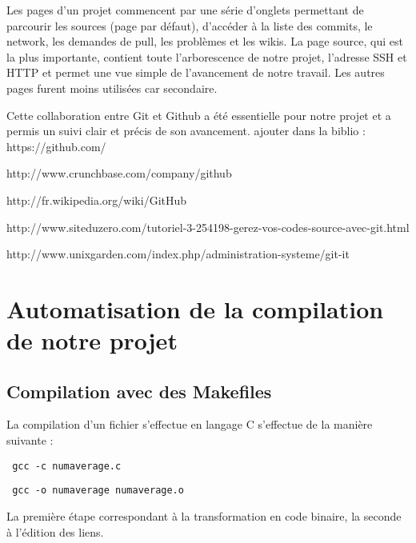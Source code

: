 Les pages d'un projet commencent par une s\'erie d'onglets permettant de parcourir les sources (page par d\'efaut), d'acc\'eder \`a la liste des
 commits, le network, les demandes de pull, les probl\`emes et les wikis.
La page source, qui est la plus importante, contient toute l'arborescence de notre projet, l'adresse SSH et HTTP et permet une vue simple
 de l'avancement de notre travail.
Les autres pages furent moins utilis\'ees car secondaire. 

Cette collaboration entre Git et Github a \'et\'e essentielle pour notre projet et a permis un suivi clair et pr\'ecis de son avancement.
\newline
\newline
\newline
\newline
ajouter dans la biblio :
\newline
https://github.com/

http://www.crunchbase.com/company/github

http://fr.wikipedia.org/wiki/GitHub

http://www.siteduzero.com/tutoriel-3-254198-gerez-vos-codes-source-avec-git.html

http://www.unixgarden.com/index.php/administration-systeme/git-it


\section{Automatisation de la compilation de notre projet}
\subsection{Compilation avec des Makefiles}

La compilation d'un fichier s'effectue en langage C s'effectue de la mani\`ere suivante :
\begin{verbatim} gcc -c numaverage.c\end{verbatim}
\begin{verbatim} gcc -o numaverage numaverage.o\end{verbatim}

La premi\`ere \'etape correspondant \`a la transformation en code binaire, la seconde \`a l'\'edition des liens.

